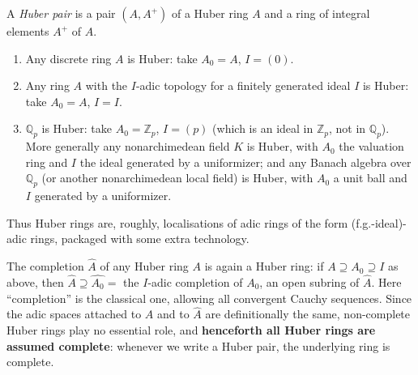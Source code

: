 \begin{definition}
\label{def:8:huber-pair}
A \emph{Huber pair} is a pair $(A,A^{+})$ of a Huber ring $A$ and a ring of
integral elements $A^{+}$ of $A$.
\end{definition}

\begin{example}
\label{ex:8:huber-examples}
\begin{enumerate}
\item Any discrete ring $A$ is Huber: take $A_{0}=A$, $I=(0)$.
\item Any ring $A$ with the $I$-adic topology for a finitely generated ideal $I$
is Huber: take $A_{0}=A$, $I=I$.
\item $\mathbb{Q}_p$ is Huber: take $A_{0}=\mathbb{Z}_p$, $I=(p)$ (which is an
ideal in $\mathbb{Z}_p$, not in $\mathbb{Q}_p$). More generally any
nonarchimedean field $K$ is Huber, with $A_{0}$ the valuation ring and $I$ the
ideal generated by a uniformizer; and any Banach algebra over $\mathbb{Q}_p$ (or
another nonarchimedean local field) is Huber, with $A_{0}$ a unit ball and $I$
generated by a uniformizer.
\end{enumerate}
Thus Huber rings are, roughly, localisations of adic rings of the form
(f.g.-ideal)-adic rings, packaged with some extra technology.
\end{example}

\begin{remark}
\label{rmk:8:completion}
The completion $\widehat{A}$ of any Huber ring $A$ is again a Huber ring: if
$A\supseteq A_{0}\supseteq I$ as above, then
$\widehat{A}\supseteq\widehat{A_{0}}=$ the $I$-adic completion of $A_{0}$, an open
subring of $\widehat{A}$. Here ``completion'' is the classical one, allowing all
convergent Cauchy sequences. Since
the adic spaces attached to $A$ and to $\widehat{A}$ are definitionally the same,
non-complete Huber rings play no essential role, and \textbf{henceforth all Huber
rings are assumed complete}: whenever we write a Huber pair, the underlying ring
is complete.
\end{remark}

